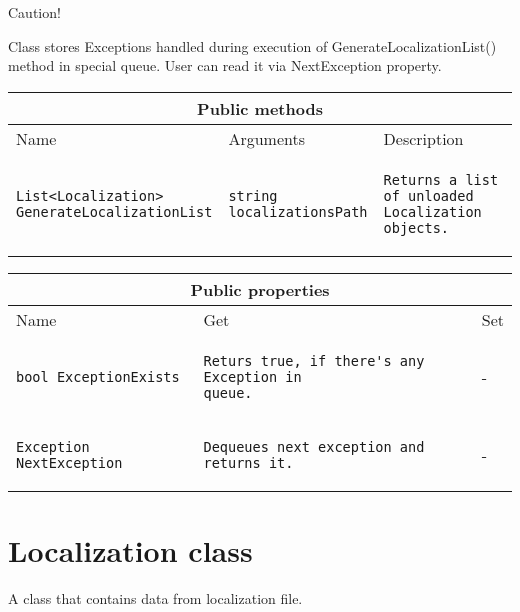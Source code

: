 \documentclass[a4paper]{report}
\begin{document}
\bigskip

Caution!

Class stores Exceptions handled during execution of GenerateLocalizationList() method in special queue. User can read it via NextException property.

\bigskip

\begin{tabular}{|l|l|l|}
\hline
\multicolumn{3}{|c|}{Public methods}\\
\hline
Name & Arguments & Description\\
\hline
\begin{lstlisting}[style=sharpc]
List<Localization>
GenerateLocalizationList
\end{lstlisting}&
\begin{lstlisting}[style=sharpc]
string
localizationsPath
\end{lstlisting}&
\begin{lstlisting}[style=sharpc]
Returns a list of unloaded
Localization objects.
\end{lstlisting}\\
\hline
\end{tabular}

\bigskip

\begin{tabular}{|l|l|l|}
\hline
\multicolumn{3}{|c|}{Public properties}\\
\hline
Name & Get & Set\\
\hline
\begin{lstlisting}[style=sharpc]
bool ExceptionExists
\end{lstlisting}&
\begin{lstlisting}[style=sharpc]
Returs true, if there's any Exception in
queue.
\end{lstlisting}&
-\\
\hline
\begin{lstlisting}[style=sharpc]
Exception NextException
\end{lstlisting}&
\begin{lstlisting}[style=sharpc]
Dequeues next exception and returns it.
\end{lstlisting}&
-\\
\hline
\end{tabular}

\section{Localization class}
A class that contains data from localization file.
\end{document}
